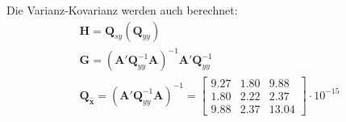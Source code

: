 Die Varianz-Kovarianz werden auch berechnet:
\begin{gather*}
	\bm{H} = \bm{Q}_{sy} (\bm{Q}_{yy}) \\
	\bm{G} = (\bm{A'} \bm{Q}_{yy}^{-1} \bm{A})^{-1} \bm{A'} \bm{Q}_{yy}^{-1} \\
	\bm{Q}_{\bm{\hat{x}}} = (\bm{A'} \bm{Q}_{yy}^{-1} \bm{A})^{-1}  = \begin{bmatrix}
		9.27 & 1.80 & 9.88 \\
		1.80 & 2.22 & 2.37 \\
		9.88 & 2.37 & 13.04
	\end{bmatrix} \cdot 10^{-15} \\
\end{gather*}
